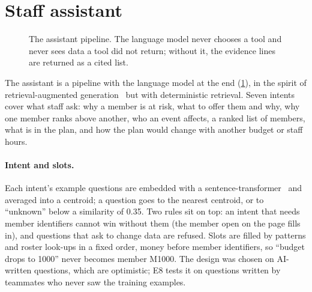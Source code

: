 \section{Staff assistant}

\begin{figure}[tb]
  \centering
  \caption{The assistant pipeline. The language model never chooses a tool and never sees data a tool did not return; without it, the evidence lines are returned as a cited list.}
  \label{fig:assistantpipe}
\end{figure}

The assistant is a pipeline with the language model at the end (\cref{fig:assistantpipe}), in the spirit of retrieval-augmented generation~\cite{lewis2020rag} but with deterministic retrieval. Seven intents cover what staff ask: why a member is at risk, what to offer them and why, why one member ranks above another, who an event affects, a ranked list of members, what is in the plan, and how the plan would change with another budget or staff hours.

\paragraph{Intent and slots.} Each intent's example questions are embedded with a sentence-transformer~\cite{reimers2019sbert} and averaged into a centroid; a question goes to the nearest centroid, or to \enquote{unknown} below a similarity of 0.35. Two rules sit on top: an intent that needs member identifiers cannot win without them (the member open on the page fills in), and questions that ask to change data are refused. Slots are filled by patterns and roster look-ups in a fixed order, money before member identifiers, so \enquote{budget drops to 1000} never becomes member M1000. The design was chosen on AI-written questions, which are optimistic; E8 tests it on questions written by teammates who never saw the training examples.

